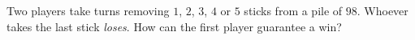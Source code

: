 Two players take turns removing $1$, $2$, $3$, $4$ or $5$ sticks from a pile of $98$. Whoever takes the last stick \emph{loses}. How can the first player guarantee a win?
